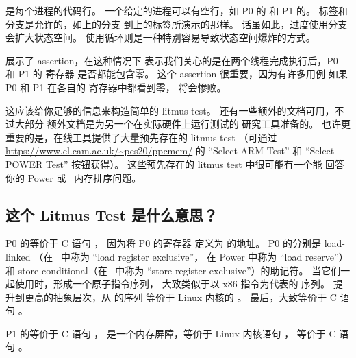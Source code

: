 \QuickQuizEnd

\begin{fcvref}
是每个进程的代码行。
一个给定的进程可以有空行，如 P0 的
和 P1 的。
标签和分支是允许的，如上的分支
到上的标签所演示的那样。
话虽如此，过度使用分支会扩大状态空间。
使用循环则是一种特别容易导致状态空间爆炸的方式。

展示了 assertion，在这种情况下
表示我们关心的是在两个线程完成执行后，P0 和 P1 的  寄存器
是否都能包含零。
这个 assertion 很重要，因为有许多用例
如果 P0 和 P1 在各自的  寄存器中都看到零，
将会惨败。

这应该给你足够的信息来构造简单的 litmus test。
还有一些额外的文档可用，不过大部分
额外文档是为另一个在实际硬件上运行测试的
研究工具准备的。
也许更重要的是，在线工具提供了大量预先存在的 litmus test
（可通过 \url{https://www.cl.cam.ac.uk/~pes20/ppcmem/}
的 ``Select ARM Test'' 和 ``Select POWER Test'' 按钮获得）。
这些预先存在的 litmus test 中很可能有一个能
回答你的 Power 或 \ARM\ 内存排序问题。

\subsection{这个 Litmus Test 是什么意思？}
\label{sec:formal:What Does This Litmus Test Mean?}

P0 的等价于 C 语句 ，
因为将 P0 的寄存器  定义为
 的地址。
P0 的分别是 load-linked
（在 \ARM\ 中称为 ``load register exclusive''，
在 Power 中称为 ``load reserve''）
和 store-conditional（在 \ARM\ 中称为
``store register exclusive''）的助记符。
当它们一起使用时，形成一个原子指令序列，
大致类似于以 x86  指令为代表的
 序列。
提升到更高的抽象层次，从
的序列
等价于 Linux 内核的 。
最后，大致等价于 C 语句 。

P1 的等价于 C 语句 ，
是一个内存屏障，等价于 Linux 内核语句 ，
等价于 C 语句 。
\end{fcvref}

